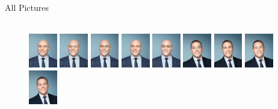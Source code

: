 \documentclass[10pt]{beamer}
\begin{document}
{\begin{frame}{All Pictures}
\begin{adjustwidth}
\begin{figure}[h!]
\\
   \centering
\includegraphics[width=0.11\textwidth]{img/pic/brunhuber-WM-026.jpg}\hfill
\includegraphics[width=0.11\textwidth]{img/pic/brunhuber-WM-249.jpg}\hfill
\includegraphics[width=0.11\textwidth]{img/pic/brunhuber-WM-241.jpg}\hfill
\includegraphics[width=0.11\textwidth]{img/pic/brunhuber-WM-242.jpg}\hfill
\includegraphics[width=0.11\textwidth]{img/pic/brunhuber-WM-243.jpg}\hfill
\includegraphics[width=0.11\textwidth]{img/pic/lemon-WM-023.jpg}\hfill
\includegraphics[width=0.11\textwidth]{img/pic/lemon-WM-221.jpg}\hfill
\includegraphics[width=0.11\textwidth]{img/pic/lemon-WM-248.jpg}\hfill
\includegraphics[width=0.11\textwidth]{img/pic/lemon-WM-214.jpg}\hfill

\end{figure}
\end{adjustwidth}
\end{frame}}
\end{document}
